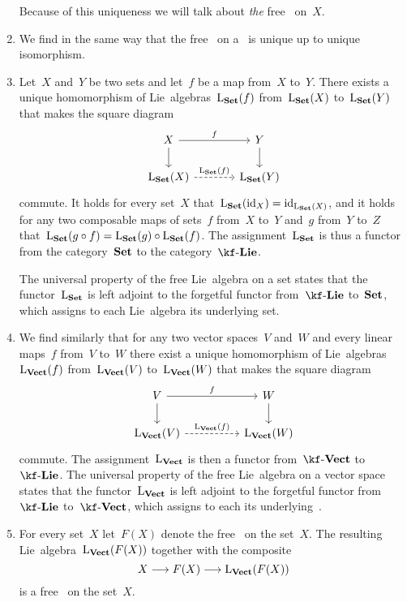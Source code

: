 \begin{remark}
\begin{enumerate}
			Because of this uniqueness we will talk about \emph{the} free~\liealgebra{$\kf$} on~$X$.
		\item
			We find in the same way that the free~\liealgebra{$\kf$} on a~\vectorspace{$\kf$} is unique up to unique isomorphism.
		\item
			Let~$X$ and~$Y$ be two sets and let~$f$ be a map from~$X$ to~$Y$.
			There exists a unique homomorphism of Lie~algebras~$\operatorname{L}_{\mathbf{Set}}(f)$ from~$\operatorname{L}_{\mathbf{Set}}(X)$ to~$\operatorname{L}_{\mathbf{Set}}(Y)$ that makes the square diagram
			\[
				\begin{tikzcd}[column sep = large]
					X
					\arrow{r}[above]{f}
					\arrow{d}
					&
					Y
					\arrow{d}
					\\
					\freelieset(X)
					\arrow[dashed]{r}[above]{\freelieset(f)}
					&
					\freelieset(Y)
				\end{tikzcd}
			\]
			commute.
			It holds for every set~$X$ that~$\operatorname{L}_{\mathbf{Set}}(\mathrm{id}_X) = \mathrm{id}_{\operatorname{L}_{\mathbf{Set}}(X)}$, and it holds for any two composable maps of sets~$f$ from~$X$ to~$Y$ and~$g$ from~$Y$ to~$Z$ that~$\operatorname{L}_{\mathbf{Set}}(g \circ f) = \operatorname{L}_{\mathbf{Set}}(g) \circ \operatorname{L}_{\mathbf{Set}}(f)$.
			The assignment~$\operatorname{L}_{\mathbf{Set}}$ is thus a functor from the category~$\mathbf{Set}$ to the category~$\cLie{\kf}$.
			
			The universal property of the free Lie~algebra on a set states that the functor~$\operatorname{L}_{\mathbf{Set}}$ is left adjoint to the forgetful functor from~$\cLie{\kf}$ to~$\mathbf{Set}$, which assigns to each Lie~algebra its underlying set.
		\item
			We find similarly that for any two vector spaces~$V$ and~$W$ and every linear maps~$f$ from~$V$ to~$W$ there exist a unique homomorphism of Lie~algebras~$\operatorname{L}_{\mathbf{Vect}}(f)$ from~$\operatorname{L}_{\mathbf{Vect}}(V)$ to~$\operatorname{L}_{\mathbf{Vect}}(W)$ that makes the square diagram
			\[
				\begin{tikzcd}[column sep = huge]
					V
					\arrow{r}[above]{f}
					\arrow{d}
					&
					W
					\arrow{d}
					\\
					\freelievect(V)
					\arrow[dashed]{r}[above]{\freelievect(f)}
					&
					\freelievect(W)
				\end{tikzcd}
			\]
			commute.
			The assignment~$\operatorname{L}_{\mathbf{Vect}}$ is then a functor from~$\cVect{\kf}$ to~$\cLie{\kf}$.
			The universal property of the free Lie~algebra on a vector space states that the functor~$\operatorname{L}_{\mathbf{Vect}}$ is left adjoint to the forgetful functor from~$\cLie{\kf}$ to~$\cVect{\kf}$, which assigns to each \liealgebra{$\kf$} its underlying~\vectorspace{$\kf$}.
		\item
			\label{free lie algebra on set via free lie algebra on vector space}
			For every set~$X$ let~$F(X)$ denote the free~\vectorspace{$\kf$} on the set~$X$.
			The resulting Lie~algebra~$\operatorname{L}_{\mathbf{Vect}}(F(X))$ together with the composite
			\[
				X
				\to
				F(X)
				\to
				\freelievect(F(X))
			\]
			is a free~\liealgebra{$\kf$} on the set~$X$.


\end{enumerate}
\end{remark}
